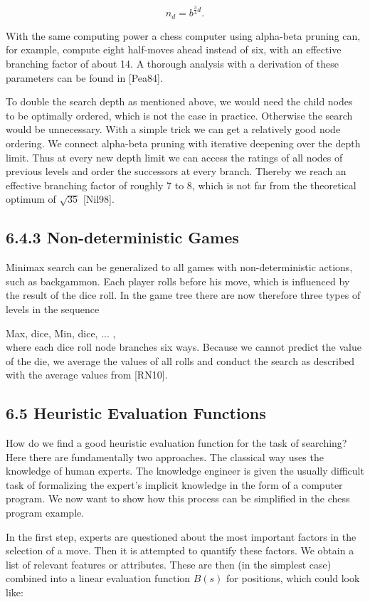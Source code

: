 \documentclass[10pt]{article}
\begin{document}
$$
n_{d}=b^{\frac{3}{4} d} .
$$

With the same computing power a chess computer using alpha-beta pruning can, for example, compute eight half-moves ahead instead of six, with an effective branching factor of about 14. A thorough analysis with a derivation of these parameters can be found in [Pea84].

To double the search depth as mentioned above, we would need the child nodes to be optimally ordered, which is not the case in practice. Otherwise the search would be unnecessary. With a simple trick we can get a relatively good node ordering. We connect alpha-beta pruning with iterative deepening over the depth limit. Thus at every new depth limit we can access the ratings of all nodes of previous levels and order the successors at every branch. Thereby we reach an effective branching factor of roughly 7 to 8, which is not far from the theoretical optimum of $\sqrt{35}$ [Nil98].

\subsection*{6.4.3 Non-deterministic Games}
Minimax search can be generalized to all games with non-deterministic actions, such as backgammon. Each player rolls before his move, which is influenced by the result of the dice roll. In the game tree there are now therefore three types of levels in the sequence

Max, dice, Min, dice, ... ,\\[0pt]
where each dice roll node branches six ways. Because we cannot predict the value of the die, we average the values of all rolls and conduct the search as described with the average values from [RN10].

\subsection*{6.5 Heuristic Evaluation Functions}
How do we find a good heuristic evaluation function for the task of searching? Here there are fundamentally two approaches. The classical way uses the knowledge of human experts. The knowledge engineer is given the usually difficult task of formalizing the expert's implicit knowledge in the form of a computer program. We now want to show how this process can be simplified in the chess program example.


In the first step, experts are questioned about the most important factors in the selection of a move. Then it is attempted to quantify these factors. We obtain a list of relevant features or attributes. These are then (in the simplest case) combined into a linear evaluation function $B(s)$ for positions, which could look like:
\end{document}
